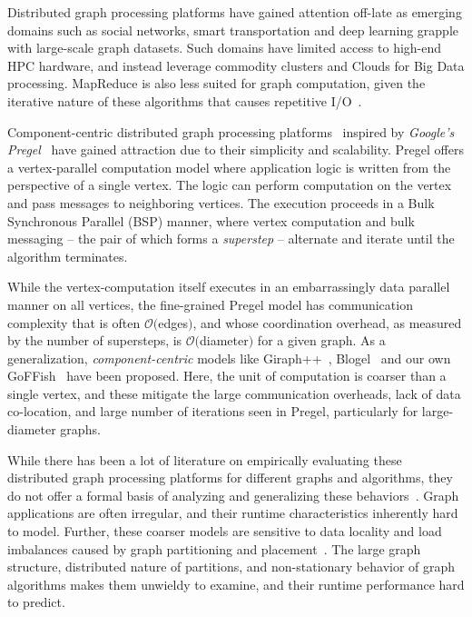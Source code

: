\documentclass[10pt,conference, compsocconf]{IEEEtran}
\begin{document}
Distributed graph processing platforms have gained attention off-late as emerging domains such as social networks, smart transportation and deep learning grapple with large-scale graph datasets. Such domains have limited access to high-end HPC hardware, and instead leverage commodity clusters and Clouds for Big Data processing. MapReduce is also less suited for graph computation, given the iterative nature of these algorithms that causes repetitive I/O~\cite{graph-twiddling}. 

Component-centric distributed graph processing platforms~\cite{goffish,blogel,giraph++} inspired by \emph{Google's Pregel}~\cite{pregel} have gained attraction due to their simplicity and scalability. Pregel offers a vertex-parallel computation model where application logic is written from the perspective of a single vertex. The logic can perform computation on the vertex and pass messages to neighboring vertices. The execution proceeds in a Bulk Synchronous Parallel (BSP) manner, where vertex computation and bulk messaging -- the pair of which forms a \emph{superstep} -- alternate and iterate until the algorithm terminates. 


While the vertex-computation itself executes in an embarrassingly data parallel manner on all vertices, the fine-grained Pregel model has communication complexity that is often $\mathcal{O}($edges$)$, and whose coordination overhead, as measured by the number of supersteps, is $\mathcal{O}($diameter$)$ for a given graph.
As a generalization, \emph{component-centric} models like Giraph++~\cite{giraph++}, Blogel~\cite{blogel} and our own GoFFish~\cite{goffish} have been proposed. Here, the unit of computation is coarser than a single vertex, and these mitigate the large communication overheads, lack of data co-location, and large number of iterations seen in Pregel, particularly for large-diameter graphs. 

While there has been a lot of literature on empirically evaluating these distributed graph processing platforms for different graphs and algorithms, they do not offer a formal basis of analyzing and generalizing these behaviors~\cite{lu2014large}. Graph applications are often irregular, and their runtime characteristics inherently hard to model. Further, these coarser models are sensitive to data locality and load imbalances caused by graph partitioning and placement~\cite{han2014experimental}. The large graph structure, distributed nature of partitions, and non-stationary behavior of graph algorithms makes them unwieldy to examine, and their runtime performance hard to predict.
\end{document}
